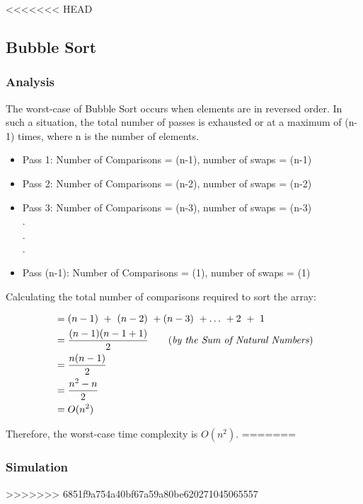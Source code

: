 <<<<<<< HEAD
\subsection{Bubble Sort}
\subsubsection{Analysis}

The worst-case of Bubble Sort occurs when elements are in reversed order. In such a situation, the total number of passes is exhausted or at a maximum of (n-1) times, where n is the number of elements.
\begin{itemize}
    \item Pass 1: Number of Comparisons = (n-1), number of swaps = (n-1)
    \item Pass 2: Number of Comparisons = (n-2), number of swaps = (n-2)    \item Pass 3: Number of Comparisons = (n-3), number of swaps = (n-3)\\
    .\\
    .\\
    .
\item Pass (n-1): Number of Comparisons = (1), number of swaps = (1)
\end{itemize}

Calculating the total number of comparisons required to sort the array:
\begin{center}
    \begin{align*}
        &= (n-1)\ +\ (n-2)\ + (n-3)\ +\dots\ + 2\ +\ 1\\
        &= \frac{(n-1)(n-1+1)}{2}\tag{\textit{by the Sum of Natural Numbers}}\\
        &= \frac{n(n-1)}{2}\\
        &= \frac{n^2 - n}{2}\\
        &= \textbf{\(O(n^2)\)}
    \end{align*}
\end{center}

Therefore, the worst-case time complexity is \(O(n^2)\).
=======
\subsubsection{Simulation}

\addImageWithSize{}{}{}
>>>>>>> 6851f9a754a40bf67a59a80be620271045065557

